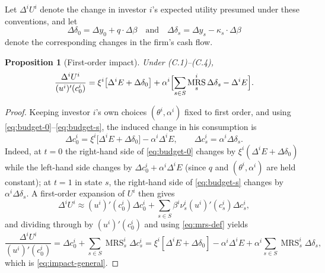 \documentclass[11pt,a4paper,oneside]{book}
\def\et{\quad \text{and} \quad}
\DeclareMathOperator{\MRS}{MRS}
\theoremstyle{plain}
\newtheorem{proposition}[theorem]{Proposition}
\theoremstyle{definition}
\theoremstyle{remark}
\numberwithin{equation}{chapter}
\begin{document}
Let $\Delta^i U^i$ denote the change in investor $i$'s expected utility presumed under these conventions, and let
\begin{equation*}
  \Delta \delta_0 = \Delta y_0 + q \cdot \Delta \beta
  \et
  \Delta \delta_s = \Delta y_s - \kappa_s \cdot \Delta \beta
\end{equation*}
denote the corresponding changes in the firm's cash flow.

\begin{proposition}[First-order impact]\label{prop:impact}
Under \textup{(C.1)--(C.4)},
\begin{equation}\label{eq:impact-general}
  \frac{\Delta^i U^i}{(u^i)'(c^i_0)}
  =
  \xi^i \bigl[ \Delta^i E + \Delta \delta_0 \bigr]
  + \alpha^i \Bigl[ \sum_{s \in S} \MRS^i_s \Delta \delta_s - \Delta^i E \Bigr].
\end{equation}
\end{proposition}

\begin{proof}
Keeping investor $i$'s own choices $(\theta^i, \alpha^i)$ fixed to first order, and using \eqref{eq:budget-0}--\eqref{eq:budget-s}, the induced change in his consumption is
\begin{equation*}
  \Delta c^i_0 = \xi^i \bigl[ \Delta^i E + \Delta \delta_0 \bigr] - \alpha^i \Delta^i E,
  \qquad
  \Delta c^i_s = \alpha^i \Delta \delta_s.
\end{equation*}
Indeed, at $t=0$ the right-hand side of \eqref{eq:budget-0} changes by $\xi^i (\Delta^i E + \Delta \delta_0)$ while the left-hand side changes by $\Delta c^i_0 + \alpha^i \Delta^i E$ (since $q$ and $(\theta^i, \alpha^i)$ are held constant); at $t=1$ in state $s$, the right-hand side of \eqref{eq:budget-s} changes by $\alpha^i \Delta \delta_s$.
A first-order expansion of $U^i$ then gives
\begin{equation*}
  \Delta^i U^i \approx (u^i)'(c^i_0) \Delta c^i_0
  + \sum_{s \in S} \beta^i \nu^i_s (u^i)'(c^i_s) \Delta c^i_s,
\end{equation*}
and dividing through by $(u^i)'(c^i_0)$ and using \eqref{eq:mrs-def} yields
\begin{equation*}
  \frac{\Delta^i U^i}{(u^i)'(c^i_0)}
  = \Delta c^i_0 + \sum_{s \in S} \MRS^i_s \Delta c^i_s
  = \xi^i [\Delta^i E + \Delta \delta_0] - \alpha^i \Delta^i E + \alpha^i \sum_{s \in S} \MRS^i_s \Delta \delta_s,
\end{equation*}
which is \eqref{eq:impact-general}.
\end{proof}
\end{document}
